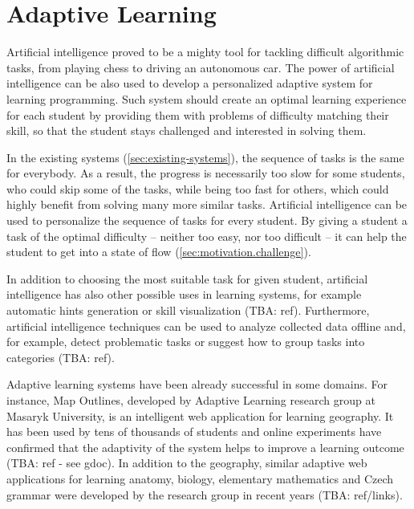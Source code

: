 \chapter{Adaptive Learning}
\label{chap:adaptive-learning}


Artificial intelligence proved to be a mighty tool
  for tackling difficult algorithmic tasks,
  from playing chess to driving an autonomous car.
The power of artificial intelligence can be also used
  to develop a personalized adaptive system for learning programming.
Such system should create an optimal learning experience for each student
  by providing them with problems of difficulty matching their skill,
  so that the student stays challenged and interested in solving them.

In the existing systems (\ref{sec:existing-systems}),
  the sequence of tasks is the same for everybody.
As a result, the progress is necessarily too slow for some students,
  who could skip some of the tasks,
  while being too fast for others,
  which could highly benefit from solving many more similar tasks.
Artificial intelligence can be used to personalize
  the sequence of tasks for every student.
By giving a student a task of the optimal difficulty
  -- neither too easy, nor too difficult --
  it can help the student to get into a state of flow
  (\ref{sec:motivation.challenge}).

In addition to choosing the most suitable task for given student,
  artificial intelligence has also other possible uses in learning systems,
  for example automatic hints generation \cite{generating-hints}
  or skill visualization (TBA: ref).
Furthermore, artificial intelligence techniques can be used
  to analyze collected data offline
  and, for example, detect problematic tasks
  or suggest how to group tasks into categories (TBA: ref).

Adaptive learning systems have been already successful in some domains.
For instance, Map Outlines,
  developed by Adaptive Learning research group at Masaryk University,
  is an intelligent web application for learning geography.
It has been used by tens of thousands of students
  and online experiments have confirmed
  that the adaptivity of the system helps to improve a learning outcome
  (TBA: ref - see gdoc).
In addition to the geography, similar adaptive web applications
  for learning anatomy, biology, elementary mathematics and Czech grammar
  were developed by the research group in recent years
  (TBA: ref/links).

